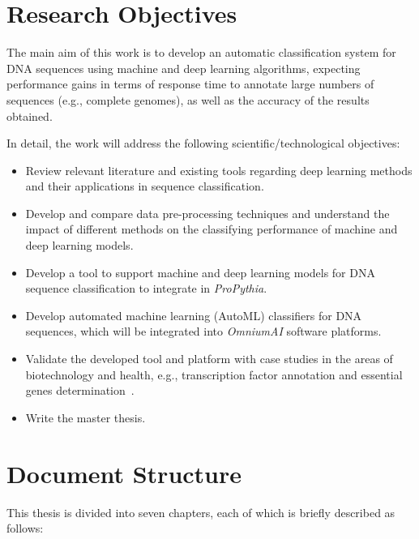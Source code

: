\section{Research Objectives} \label{sec:research_objectives}

The main aim of this work is to develop an automatic classification system for DNA sequences using machine and deep learning algorithms, expecting performance gains in terms of response time to annotate large numbers of sequences (e.g., complete genomes), as well as the accuracy of the results obtained. 

In detail, the work will address the following scientific/technological objectives:

\begin{itemize}
    \item Review relevant literature and existing tools regarding deep learning methods and their applications in sequence classification.
    \item Develop and compare data pre-processing techniques and understand the impact of different methods on the classifying performance of machine and deep learning models.
    \item Develop a tool to support machine and deep learning models for DNA sequence classification to integrate in \textit{ProPythia}.
    \item Develop automated machine learning (AutoML) classifiers for DNA sequences, which will be integrated into \textit{OmniumAI} software platforms.
    \item Validate the developed tool and platform with case studies in the areas of biotechnology and health, e.g., transcription factor annotation and essential genes determination~\cite{Zhang2020DeepHE:Learning,Quang2016DanQ:Sequences,Novakovsky2021BiologicallyPrediction}.
    \item Write the master thesis.
\end{itemize} 


\section{Document Structure} \label{sec:document_structure}

This thesis is divided into seven chapters, each of which is briefly described as follows:

